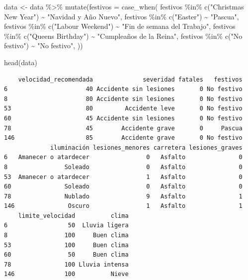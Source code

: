 \documentclass[
  letterpaper,
  DIV=11,
  numbers=noendperiod]{scrartcl}
\newenvironment{Shaded}{\begin{snugshade}}{\end{snugshade}}
\newcommand{\AttributeTok}[1]{\textcolor[rgb]{0.40,0.45,0.13}{#1}}
\newcommand{\FunctionTok}[1]{\textcolor[rgb]{0.28,0.35,0.67}{#1}}
\newcommand{\NormalTok}[1]{\textcolor[rgb]{0.00,0.23,0.31}{#1}}
\newcommand{\OtherTok}[1]{\textcolor[rgb]{0.00,0.23,0.31}{#1}}
\newcommand{\SpecialCharTok}[1]{\textcolor[rgb]{0.37,0.37,0.37}{#1}}
\newcommand{\StringTok}[1]{\textcolor[rgb]{0.13,0.47,0.30}{#1}}
\begin{document}
\begin{Shaded}
\begin{Highlighting}[]
\NormalTok{data }\OtherTok{\textless{}{-}}\NormalTok{ data }\SpecialCharTok{\%\textgreater{}\%}
  \FunctionTok{mutate}\NormalTok{(}\AttributeTok{festivos =} \FunctionTok{case\_when}\NormalTok{(}
\NormalTok{    festivos }\SpecialCharTok{\%in\%} \FunctionTok{c}\NormalTok{(}\StringTok{"Christmas New Year"}\NormalTok{) }\SpecialCharTok{\textasciitilde{}} \StringTok{"Navidad y Año Nuevo"}\NormalTok{,}
\NormalTok{    festivos }\SpecialCharTok{\%in\%} \FunctionTok{c}\NormalTok{(}\StringTok{"Easter"}\NormalTok{) }\SpecialCharTok{\textasciitilde{}} \StringTok{"Pascua"}\NormalTok{,}
\NormalTok{    festivos }\SpecialCharTok{\%in\%} \FunctionTok{c}\NormalTok{(}\StringTok{"Labour Weekend"}\NormalTok{) }\SpecialCharTok{\textasciitilde{}} \StringTok{"Fin de semana del Trabajo"}\NormalTok{,}
\NormalTok{    festivos }\SpecialCharTok{\%in\%} \FunctionTok{c}\NormalTok{(}\StringTok{"Queens Birthday"}\NormalTok{) }\SpecialCharTok{\textasciitilde{}} \StringTok{"Cumpleaños de la Reina"}\NormalTok{,}
\NormalTok{    festivos }\SpecialCharTok{\%in\%} \FunctionTok{c}\NormalTok{(}\StringTok{"No festivo"}\NormalTok{) }\SpecialCharTok{\textasciitilde{}} \StringTok{"No festivo"}\NormalTok{,}
\NormalTok{  ))}


\FunctionTok{head}\NormalTok{(data)}
\end{Highlighting}
\end{Shaded}

\begin{verbatim}
    velocidad_recomendada              severidad fatales   festivos
6                      40 Accidente sin lesiones       0 No festivo
8                      80 Accidente sin lesiones       0 No festivo
53                     80         Accidente leve       0 No festivo
60                     45 Accidente sin lesiones       0 No festivo
78                     45        Accidente grave       0     Pascua
146                    85        Accidente grave       0 No festivo
             iluminación lesiones_menores carretera lesiones_graves
6   Amanecer o atardecer                0   Asfalto               0
8                Soleado                0   Asfalto               0
53  Amanecer o atardecer                1   Asfalto               0
60               Soleado                0   Asfalto               0
78               Nublado                9   Asfalto               1
146               Oscuro                1   Asfalto               1
    limite_velocidad          clima
6                 50  Lluvia ligera
8                100     Buen clima
53               100     Buen clima
60                50     Buen clima
78               100 Lluvia intensa
146              100          Nieve
\end{verbatim}
\end{document}
